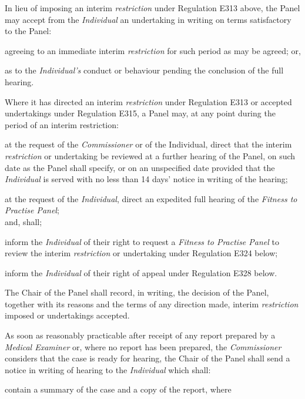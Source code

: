 \par
In lieu of imposing an interim \emph{restriction} under Regulation E313
above, the Panel may accept from the \emph{Individual} an undertaking in
writing on terms satisfactory to the Panel:\\\nl \item  agreeing to an immediate interim \emph{restriction} for such period
as may be agreed; or,\item as to the \emph{Individual's} conduct or behaviour pending the
conclusion of the full hearing.\ln
{}\par
Where it has directed an interim \emph{restriction} under Regulation
E313 or accepted undertakings under Regulation E315, a Panel may, at any
point during the period of an interim restriction:\\\nl \item at the request of the \emph{Commissioner} or of the Individual,
direct that the interim \emph{restriction} or undertaking be reviewed at
a further hearing of the Panel, on such date as the Panel shall specify,
or on an unspecified date provided that the \emph{Individual} is served
with no less than 14 days' notice in writing of the hearing;\item at the request of the \emph{Individual}, direct an expedited full
hearing of the \emph{Fitness to Practise Panel};\\
and, shall;\al
\item inform the \emph{Individual} of their right to request
a \emph{Fitness to Practise Panel }to review the
interim \emph{restriction} or undertaking under Regulation E324 below;\\
\item inform the \emph{Individual} of their right of appeal under
Regulation E328 below.\la\ln
{}\par
The Chair of the Panel shall record, in writing, the decision of the
Panel, together with its reasons and the terms of any direction made,
interim \emph{restriction} imposed or undertakings accepted.
\par
{}
As soon as reasonably practicable after receipt of any report prepared
by a \emph{Medical Examiner} or, where no report has been prepared,
the \emph{Commissioner} considers that the case is ready for hearing,
the Chair of the Panel shall send a notice in writing of hearing to
the \emph{Individual} which shall:\\\nl \item contain a summary of the case and a copy of the report, where
